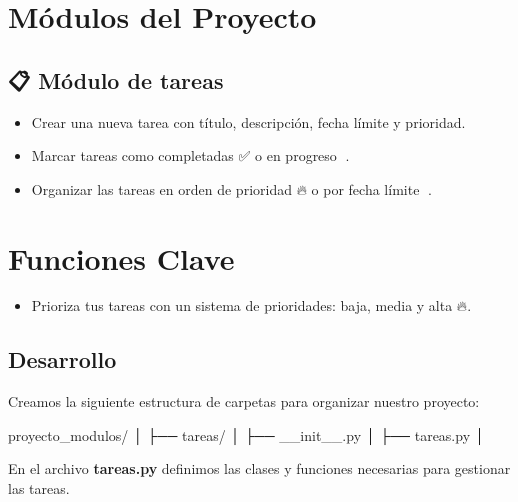 \documentclass[
  a4paper,
  DIV=11,
  numbers=noendperiod,
  onepage,
  openany]{scrreprt}
\newenvironment{Shaded}{\begin{snugshade}}{\end{snugshade}}
\newcommand{\NormalTok}[1]{\textcolor[rgb]{0.00,0.23,0.31}{#1}}
\providecommand{\tightlist}{%
  \setlength{\itemsep}{0pt}\setlength{\parskip}{0pt}}\usepackage{longtable,booktabs,array}
\begin{document}
\section{Módulos del Proyecto}\label{muxf3dulos-del-proyecto}

\subsection{📋 Módulo de tareas}\label{muxf3dulo-de-tareas}

\begin{itemize}
\item
  Crear una nueva tarea con título, descripción, fecha límite y
  prioridad.
\item
  Marcar tareas como completadas ✅ o en progreso 🔄.
\item
  Organizar las tareas en orden de prioridad 🔥 o por fecha límite 📅.
\end{itemize}

\section{Funciones Clave}\label{funciones-clave}

\begin{itemize}
\tightlist
\item
  Prioriza tus tareas con un sistema de prioridades: baja, media y alta
  🔥.
\end{itemize}

\subsection{Desarrollo}\label{desarrollo}

Creamos la siguiente estructura de carpetas para organizar nuestro
proyecto:

\begin{Shaded}
\begin{Highlighting}[]
\NormalTok{proyecto\_modulos/}
\NormalTok{│}
\NormalTok{├── tareas/}
\NormalTok{│   ├── \_\_init\_\_.py}
\NormalTok{│   ├── tareas.py}
\NormalTok{│}
\end{Highlighting}
\end{Shaded}

En el archivo \textbf{tareas.py} definimos las clases y funciones
necesarias para gestionar las tareas.
\end{document}
